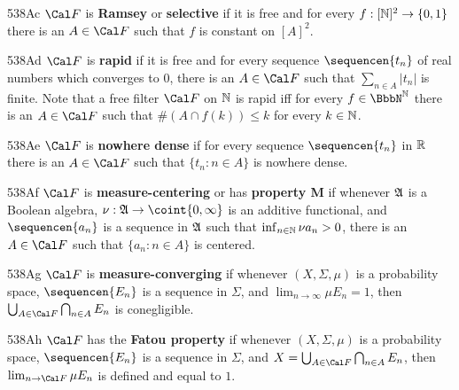 \spheader 538Ac $\Cal F$ is {\bf Ramsey} or {\bf selective}
if it is free and for every
$f:[\Bbb N]^2\to\{0,1\}$ there is an $A\in\Cal F$ such that $f$ is constant
on $[A]^2$.

\spheader 538Ad $\Cal F$ is {\bf rapid} if it is free and for
every sequence $\sequencen{t_n}$
of real numbers which converges to $0$, there is an $A\in\Cal F$ such that
$\sum_{n\in A}|t_n|$ is finite.   Note that a free filter $\Cal F$ on
$\Bbb N$ is rapid iff for every $f\in\BbbN^{\Bbb N}$ there is an
$A\in\Cal F$ such that $\#(A\cap f(k))\le k$ for every $k\in\Bbb N$.

\spheader 538Ae $\Cal F$ is {\bf nowhere dense} if for every sequence
$\sequencen{t_n}$ in $\Bbb R$ there is an $A\in\Cal F$ such that
$\{t_n:n\in A\}$ is nowhere dense.

\spheader 538Af $\Cal F$ is {\bf measure-centering} or has {\bf property M}
if whenever $\frak A$ is a Boolean algebra,
$\nu:\frak A\to\coint{0,\infty}$ is an additive functional, and
$\sequencen{a_n}$ is a sequence in $\frak A$ such that
$\inf_{n\in\Bbb N}\nu a_n>0$, there is an $A\in\Cal F$ such that
$\{a_n:n\in A\}$ is centered.

\spheader 538Ag $\Cal F$ is {\bf measure-converging} if
whenever $(X,\Sigma,\mu)$ is a probability space,
$\sequencen{E_n}$ is a sequence in
$\Sigma$, and $\lim_{n\to\infty}\mu E_n=1$, then
$\bigcup_{A\in\Cal F}\bigcap_{n\in A}E_n$ is conegligible.

\spheader 538Ah $\Cal F$ has the {\bf Fatou property} if whenever
$(X,\Sigma,\mu)$ is a probability space, $\sequencen{E_n}$ is a sequence in
$\Sigma$, and $X=\bigcup_{A\in\Cal F}\bigcap_{n\in A}E_n$, then
$\lim_{n\to\Cal F}\mu E_n$ is defined and equal to $1$.

